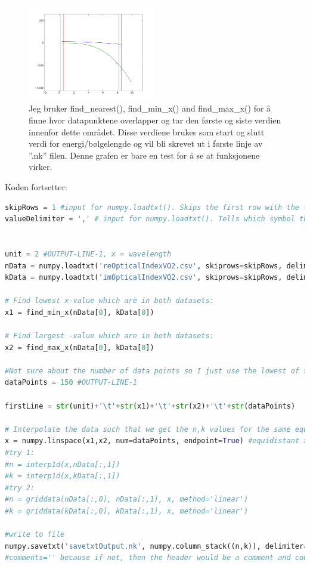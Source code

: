 %
\newpage
\begin{figure}[h!] 
\centering 
\includegraphics[width=0.5\textwidth]{dataBoundaries.png} 
\caption{Jeg bruker find\_nearest(), find\_min\_x() and find\_max\_x() for å finne hvor datapunktene 
overlapper og tar den første og siste verdien innenfor dette området. Disse verdiene brukes som
start og slutt verdi for energi/bølgelengde og vil bli skrevet ut i første linje av ''.nk'' filen. 
Denne grafen er bare en test for å se at funksjonene virker.} 
\end{figure}

Koden fortsetter:
\begin{lstlisting}[style=formattednumber,frame=none, language=python]
skipRows = 1 #input for numpy.loadtxt(). Skips the first row with the top information
valueDelimiter = ',' # input for numpy.loadtxt(). Tells which symbol that separates the data


unit = 2 #OUTPUT-LINE-1, x = wavelength
nData = numpy.loadtxt('reOpticalIndexVO2.csv', skiprows=skipRows, delimiter=valueDelimiter)
kData = numpy.loadtxt('imOpticalIndexVO2.csv', skiprows=skipRows, delimiter=valueDelimiter)

# Find lowest x-value which are in both datasets:
x1 = find_min_x(nData[0], kData[0])

# Find largest -value which are in both datasets:
x2 = find_max_x(nData[0], kData[0])

#Not sure about the number of data points so I just use the lowest of the two:
dataPoints = 150 #OUTPUT-LINE-1

firstLine = str(unit)+'\t'+str(x1)+'\t'+str(x2)+'\t'+str(dataPoints)  

# Interpolate the data such that we get the n,k values for the same equidistant x-values:
x = numpy.linspace(x1,x2, num=dataPoints, endpoint=True) #equidistant x-values
#try 1:
#n = interp1d(x,nData[:,1])
#k = interp1d(x,kData[:,1])
#try 2:
#n = griddata(nData[:,0], nData[:,1], x, method='linear')
#k = griddata(kData[:,0], kData[:,1], x, method='linear')

#write to file
numpy.savetxt('savetxtOutput.nk', numpy.column_stack((n,k)), delimiter='\t', header=firstLine, comments='')
#comments='' because if not, then the header would be a comment and contain the #-symbol
\end{lstlisting}

